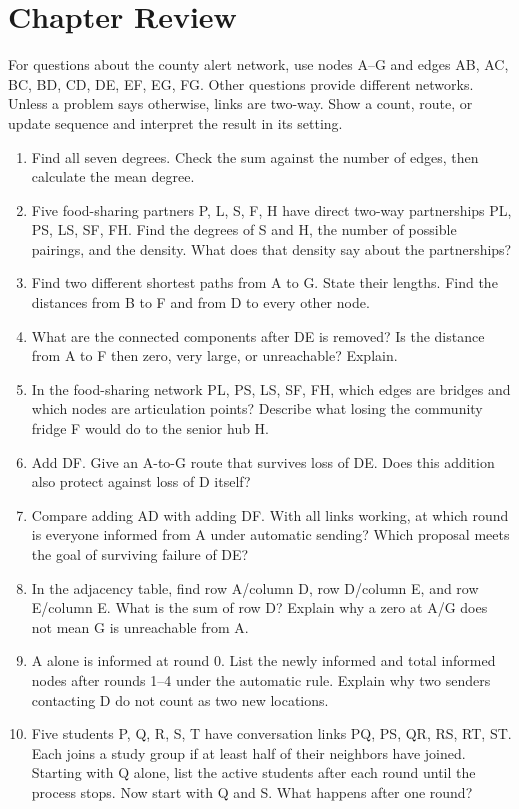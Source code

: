 \documentclass[11pt,letterpaper]{article}
\begin{document}
\section*{Chapter Review}
For questions about the county alert network, use nodes A--G and edges AB, AC, BC, BD, CD, DE, EF, EG, FG. Other questions provide different networks. Unless a problem says otherwise, links are two-way. Show a count, route, or update sequence and interpret the result in its setting.
\begin{enumerate}
\item Find all seven degrees. Check the sum against the number of edges, then calculate the mean degree.
\item Five food-sharing partners P, L, S, F, H have direct two-way partnerships PL, PS, LS, SF, FH. Find the degrees of S and H, the number of possible pairings, and the density. What does that density say about the partnerships?
\item Find two different shortest paths from A to G. State their lengths. Find the distances from B to F and from D to every other node.
\item What are the connected components after DE is removed? Is the distance from A to F then zero, very large, or unreachable? Explain.
\item In the food-sharing network PL, PS, LS, SF, FH, which edges are bridges and which nodes are articulation points? Describe what losing the community fridge F would do to the senior hub H.
\item Add DF. Give an A-to-G route that survives loss of DE. Does this addition also protect against loss of D itself?
\item Compare adding AD with adding DF. With all links working, at which round is everyone informed from A under automatic sending? Which proposal meets the goal of surviving failure of DE?
\item In the adjacency table, find row A/column D, row D/column E, and row E/column E. What is the sum of row D? Explain why a zero at A/G does not mean G is unreachable from A.
\item A alone is informed at round 0. List the newly informed and total informed nodes after rounds 1--4 under the automatic rule. Explain why two senders contacting D do not count as two new locations.
\item Five students P, Q, R, S, T have conversation links PQ, PS, QR, RS, RT, ST. Each joins a study group if at least half of their neighbors have joined. Starting with Q alone, list the active students after each round until the process stops. Now start with Q and S. What happens after one round?

\end{enumerate}
\end{document}
